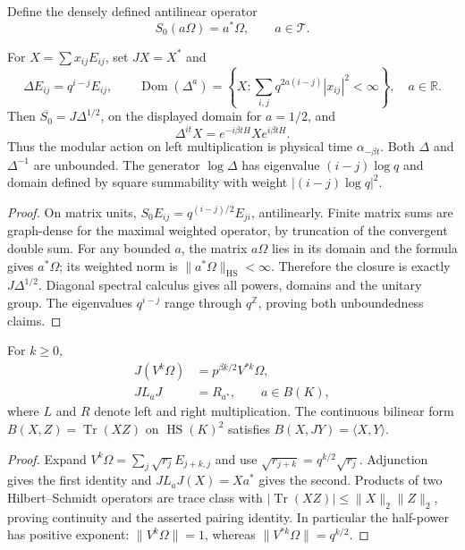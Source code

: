 Define the densely defined antilinear operator
\begin{equation}
\label{v4-arith:kms-gns:eq:S-def}
S_0(a\Omega)=a^*\Omega,\qquad a\in\mathcal T.
\end{equation}
\begin{lemma}
\label{v4-arith:kms-gns:lem:Delta}
For \(X=\sum x_{ij}E_{ij}\), set \(JX=X^*\) and
\begin{equation}
\label{v4-arith:kms-gns:eq:Delta-basis}
\Delta E_{ij}=q^{i-j}E_{ij},\qquad
\operatorname{Dom}(\Delta^a)=
\left\{X:\sum_{i,j}q^{2a(i-j)}|x_{ij}|^2<\infty\right\},\quad a\in\mathbb R.
\end{equation}
Then \(\overline{S_0}=J\Delta^{1/2}\), on the displayed domain for
\(a=1/2\), and
\begin{equation}
\label{v4-arith:kms-gns:eq:Delta-formula}
\Delta^{it}X=e^{-i\beta tH}Xe^{i\beta tH}.
\end{equation}
Thus the modular action on left multiplication is physical time
\(\alpha_{-\beta t}\). Both \(\Delta\) and \(\Delta^{-1}\) are
unbounded. The generator \(\log\Delta\) has eigenvalue
\((i-j)\log q\) and domain defined by square summability with
weight \(|(i-j)\log q|^2\).
\end{lemma}
\begin{proof}
On matrix units, \(S_0E_{ij}=q^{(i-j)/2}E_{ji}\), antilinearly.
Finite matrix sums are graph-dense for the maximal weighted
operator, by truncation of the convergent double sum. For any
bounded \(a\), the matrix \(a\Omega\) lies in its domain and the
formula gives \(a^*\Omega\); its weighted norm is
\(\|a^*\Omega\|_{\mathrm{HS}}<\infty\). Therefore the closure is
exactly \(J\Delta^{1/2}\). Diagonal spectral calculus gives all
powers, domains and the unitary group. The eigenvalues \(q^{i-j}\)
range through \(q^{\mathbb Z}\), proving both unboundedness claims.
\end{proof}

\begin{proposition}
\label{v4-arith:kms-gns:prop:J-equals-sigma-BC}
For \(k\geq0\),
\begin{align}
\label{v4-arith:kms-gns:eq:J-basis}
J(V^k\Omega)&=p^{\beta k/2}V^{*k}\Omega,\\
\label{v4-arith:kms-gns:eq:J-on-algebra}
JL_aJ&=R_{a^*},\qquad a\in B(K),
\end{align}
where \(L\) and \(R\) denote left and right multiplication.
The continuous bilinear form \(B(X,Z)=\operatorname{Tr}(XZ)\)
on \(\operatorname{HS}(K)^2\) satisfies
\(B(X,JY)=\langle X,Y\rangle\).
\end{proposition}
\begin{proof}
Expand \(V^k\Omega=\sum_j\sqrt{r_j}E_{j+k,j}\) and use
\(\sqrt{r_{j+k}}=q^{k/2}\sqrt{r_j}\). Adjunction gives the first
identity and \(J L_aJ(X)=Xa^*\) gives the second.
Products of two Hilbert--Schmidt operators are trace class with
\(|\operatorname{Tr}(XZ)|\leq\|X\|_2\|Z\|_2\), proving continuity
and the asserted pairing identity. In particular the half-power
has positive exponent: \(\|V^k\Omega\|=1\), whereas
\(\|V^{*k}\Omega\|=q^{k/2}\).
\end{proof}

